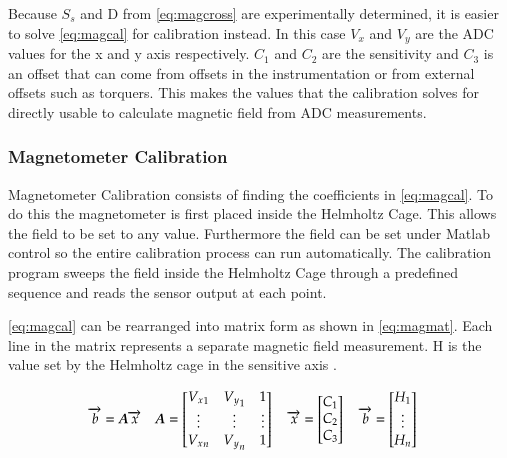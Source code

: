 Because $S_s$ and D from \autoref{eq:magcross} are experimentally determined, it is easier to solve \autoref{eq:magcal} for calibration instead. In this case $V_x$ and $V_y$ are the \ac{ADC} values for the x and y axis respectively. $C_1$ and $C_2$ are the sensitivity and $C_3$ is an offset that can come from offsets in the instrumentation or from external offsets such as torquers. This makes the values that the calibration solves for directly usable to calculate magnetic field from \ac{ADC} measurements.

\subsubsection{Magnetometer Calibration}

Magnetometer Calibration consists of finding the coefficients in \autoref{eq:magcal}. To do this the magnetometer is first placed inside the Helmholtz Cage. This allows the field to be set to any value. Furthermore the field can be set under Matlab control so the entire calibration process can run automatically. The calibration program sweeps the field inside the Helmholtz Cage through a predefined sequence and reads the sensor output at each point. 

\vspace{2em}
\autoref{eq:magcal} can be rearranged into matrix form as shown in \autoref{eq:magmat}. Each line in the matrix represents a separate magnetic field measurement. H is the value set by the Helmholtz cage in the sensitive axis . 

\begin{equation}
    \overrightarrow{b}=\boldsymbol{A} \overrightarrow{x} \quad
    \boldsymbol{A} =
    \begin{bmatrix}
        {V_x}_1 & {V_y}_1 & 1 \\
        \vdots & \vdots & \vdots\\
        {V_x}_n & {V_y}_n & 1 \\
    \end{bmatrix} \quad
    \overrightarrow{x} = 
    \begin{bmatrix}
        C_1 \\
        C_2 \\
        C_3 \\
    \end{bmatrix} \quad
    \overrightarrow{b} = 
    \begin{bmatrix}
        H_1 \\
        \vdots \\
        H_n \\
    \end{bmatrix} \quad
    \label{eq:magmat}
\end{equation}

